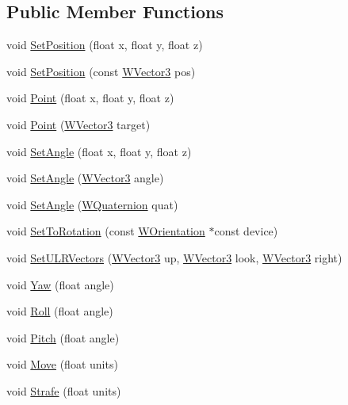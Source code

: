 \subsection*{Public Member Functions}
\begin{DoxyCompactItemize}
\item 
void \hyperlink{class_w_orientation_a3a68aa49d184514b0dbe6771de72e6d1}{Set\+Position} (float x, float y, float z)
\item 
void \hyperlink{class_w_orientation_a39989d6816e328259d2937fc0506b7bd}{Set\+Position} (const \hyperlink{class_w_vector3}{W\+Vector3} pos)
\item 
void \hyperlink{class_w_orientation_a0c0a0b7237d4d30f3385aa98f1a8ffae}{Point} (float x, float y, float z)
\item 
void \hyperlink{class_w_orientation_a1eff9c421a793b32e2e861fa946e2b31}{Point} (\hyperlink{class_w_vector3}{W\+Vector3} target)
\item 
void \hyperlink{class_w_orientation_a7fdd3e9e05c7a248524a085369aaf91c}{Set\+Angle} (float x, float y, float z)
\item 
void \hyperlink{class_w_orientation_a6b0d871c5f43b449cfde84471b5d7767}{Set\+Angle} (\hyperlink{class_w_vector3}{W\+Vector3} angle)
\item 
void \hyperlink{class_w_orientation_a60a647b2aa8e1eed0046ae40f9f3bbdf}{Set\+Angle} (\hyperlink{group__engineclass_ga717cc687f6844e7a4a2de4948b96c6ef}{W\+Quaternion} quat)
\item 
void \hyperlink{class_w_orientation_a5c6b86367863894a8f1d8bf0f81984ab}{Set\+To\+Rotation} (const \hyperlink{class_w_orientation}{W\+Orientation} $\ast$const device)
\item 
void \hyperlink{class_w_orientation_a35b078ed1a5da4500552eab4b6f249f0}{Set\+U\+L\+R\+Vectors} (\hyperlink{class_w_vector3}{W\+Vector3} up, \hyperlink{class_w_vector3}{W\+Vector3} look, \hyperlink{class_w_vector3}{W\+Vector3} right)
\item 
void \hyperlink{class_w_orientation_a12b970c9255a7d36db7c0d33110dfb86}{Yaw} (float angle)
\item 
void \hyperlink{class_w_orientation_a3590a1fec64b4d2e705652be84ad92a3}{Roll} (float angle)
\item 
void \hyperlink{class_w_orientation_ad8ec4b178ba429d2a3b3a26818992007}{Pitch} (float angle)
\item 
void \hyperlink{class_w_orientation_ac56b6bfeaea177b1b0a8a3db56c2c1c2}{Move} (float units)
\item 
void \hyperlink{class_w_orientation_a052cf06c287c50c4c155edf1a76ca44f}{Strafe} (float units)

\end{DoxyCompactItemize}
